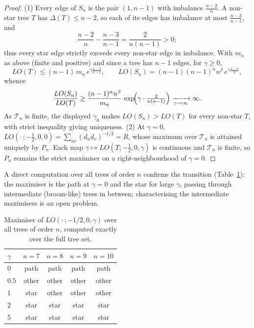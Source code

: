 \documentclass[a5paper, 10pt]{article}
\theoremstyle{plain}
\theoremstyle{remark}
\theoremstyle{definition}
\begin{document}
\begin{proof}
(1) Every edge of $S_n$ is the pair $(1, n-1)$ with imbalance
$\tfrac{n-2}{n}$. A non-star tree $T$ has $\Delta(T) \le n-2$, so
each of its edges has imbalance at most $\tfrac{n-3}{n-1}$, and
\[
\frac{n-2}{n} - \frac{n-3}{n-1} = \frac{2}{n(n-1)} > 0;
\]
thus every star edge strictly exceeds every non-star edge in
imbalance. With $m_n$ as above (finite and positive) and since a
tree has $n-1$ edges, for $\gamma \ge 0$,
\[
LO(T) \le (n-1)\, m_n\, e^{\gamma \frac{n-3}{n-1}},
\qquad
LO(S_n) = (n-1)(n-1)^{\alpha} n^{\beta}\, e^{\gamma \frac{n-2}{n}},
\]
whence
\[
\frac{LO(S_n)}{LO(T)}
\ge \frac{(n-1)^{\alpha} n^{\beta}}{m_n}\,
\exp\!\Bigl(\gamma \cdot \tfrac{2}{n(n-1)}\Bigr)
\xrightarrow[\gamma \to \infty]{} \infty.
\]
As $\mathcal{T}_n$ is finite, the displayed $\gamma_0$ makes
$LO(S_n) > LO(T)$ for every non-star $T$, with strict inequality
giving uniqueness. (2) At $\gamma = 0$,
$LO(\cdot\,; -\tfrac12, 0, 0) = \sum_{uv} (d_u d_v)^{-1/2} = R$,
whose maximum over $\mathcal{T}_n$ is attained uniquely by $P_n$.
Each map $\gamma \mapsto LO(T; -\tfrac12, 0, \gamma)$ is continuous
and $\mathcal{T}_n$ is finite, so $P_n$ remains the strict maximiser
on a right-neighbourhood of $\gamma = 0$.
\end{proof}

A direct computation over all trees of order $n$ confirms the
transition (Table~\ref{tab:switch}): the maximiser is the path at
$\gamma = 0$ and the star for large $\gamma$, passing through
intermediate (broom-like) trees in between; characterising the
intermediate maximisers is an open problem.

\begin{table}[H]
\centering
\caption{Maximiser of $LO(\cdot\,; -1/2, 0, \gamma)$ over all trees of order $n$, computed exactly over the full tree set.}
\label{tab:switch}
\small
\begin{tabular}{lcccc}
\toprule
$\gamma$ & $n = 7$ & $n = 8$ & $n = 9$ & $n = 10$\\
\midrule
$0$   & path  & path  & path  & path\\
$0.5$ & other & other & other & other\\
$1$   & star  & other & other & other\\
$2$   & star  & star  & star  & star\\
$5$   & star  & star  & star  & star\\
\bottomrule
\end{tabular}
\end{table}
\end{document}
